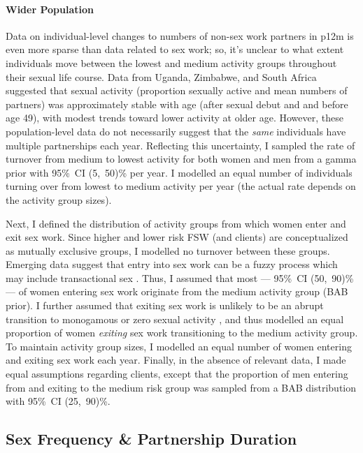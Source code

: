 \paragraph{Wider Population}
Data on individual-level changes to numbers of non-sex work partners in p12m
is even more sparse than data related to sex work;
so, it's unclear to what extent individuals move between the lowest and medium activity groups
throughout their sexual life course.
Data from Uganda, Zimbabwe, and South Africa \cite{Todd2009}
suggested that sexual activity (proportion sexually active and mean numbers of partners)
was approximately stable with age (after sexual debut and and before age 49),
with modest trends toward lower activity at older age.
However, these population-level data do not necessarily suggest that
the \emph{same} individuals have multiple partnerships each year.
Reflecting this uncertainty, I sampled
the rate of turnover from medium to lowest activity for both women and men
from a gamma prior with 95\%~CI (5,~50)\% per year.
I modelled an equal number of individuals turning over from lowest to medium activity per year
(the actual rate depends on the activity group sizes).
\par
Next, I defined the distribution of activity groups from which women enter and exit sex work.
Since higher and lower risk FSW (and clients) are conceptualized as mutually exclusive groups,
I modelled no turnover between these groups.
Emerging data suggest that entry into sex work can be a fuzzy process
which may include transactional sex \cite{Cheuk2020,Ma2020}.
Thus, I assumed that most --- 95\%~CI (50,~90)\% --- of women entering sex work
originate from the medium activity group (BAB prior).
I further assumed that exiting sex work is unlikely to be
an abrupt transition to monogamous or zero sexual activity \cite{Scorgie2012,Learmonth2015},
and thus modelled an equal proportion of women \emph{exiting} sex work
transitioning to the medium activity group.
To maintain activity group sizes, I modelled
an equal number of women entering and exiting sex work each year.
Finally, in the absence of relevant data, I made equal assumptions regarding clients,
except that the proportion of men entering from and exiting to the medium risk group
was sampled from a BAB distribution with 95\%~CI (25,~90)\%.
\subsection{Sex Frequency \& Partnership Duration}\label{model.par.sex}
